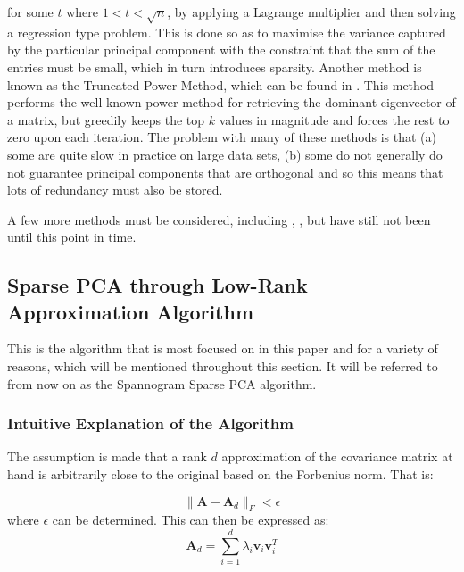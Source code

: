 \documentclass[11pt,a4paper]{article}
\begin{document}
for some $t$ where $1<t<\sqrt{n}$, by applying a Lagrange multiplier and then solving a regression type problem. This is done so as to maximise the variance captured by the particular principal component with the constraint that the sum of the entries must be small, which in turn introduces sparsity. Another method is known as the Truncated Power Method, which can be found in \cite{truncpower}. This method performs the well known power method for retrieving the dominant eigenvector of a matrix, but greedily keeps the top $k$ values in magnitude and forces the rest to zero upon each iteration. The problem with many of these methods is that (a) some are quite slow in practice on large data sets, (b) some do not generally do not guarantee principal components that are orthogonal and so this means that lots of redundancy must also be stored. 

A few more methods must be considered, including \cite{shen}, \cite{zou}, \cite{daspremont} but have still not been until this point in time. 

\subsection{Sparse PCA through Low-Rank Approximation Algorithm\cite{dimakis}}
This is the algorithm that is most focused on in this paper and for a variety of reasons, which will be mentioned throughout this section. It will be referred to from now on as the Spannogram Sparse PCA algorithm.

\subsubsection{Intuitive Explanation of the Algorithm}
The assumption is made that a rank $d$ approximation of the covariance matrix at hand is arbitrarily close to the original based on the Forbenius norm. That is:

\begin{equation*}
\|\mathbf{A} - \mathbf{A}_d\|_F < \epsilon
\end{equation*}
where $\epsilon$ can be determined. This can then be expressed as:
\begin{equation*}
\mathbf{A}_d = \sum_{i=1}^d \lambda_i \mathbf{v}_i \mathbf{v}_i^T
\end{equation*}
\end{document}
